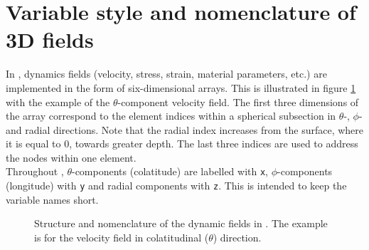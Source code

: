 \section{Variable style and nomenclature of 3D fields}\label{S:variables}

In \SES, dynamics fields (velocity, stress, strain, material parameters, etc.) are implemented in the form of six-dimensional arrays. This is illustrated in figure \ref{F:variables} with the example of the
$\theta$-component velocity field. The first three dimensions of the array correspond to the element indices within a spherical subsection in $\theta$-, $\phi$- and radial directions. Note that
the radial index increases from the surface, where it is equal to $0$, towards greater depth. The last three indices are used to address the nodes within one element.\\[5pt]
Throughout \SES, $\theta$-components (colatitude) are labelled with \texttt{x}, $\phi$-components (longitude) with \texttt{y} and radial components with \texttt{z}. This is intended to keep the variable names short.
\begin{center}
\begin{figure}
\center{}
\caption{Structure and nomenclature of the dynamic fields in \SES. The example is for the velocity field in colatitudinal ($\theta$) direction.}\label{F:variables}
\end{figure}
\end{center}


